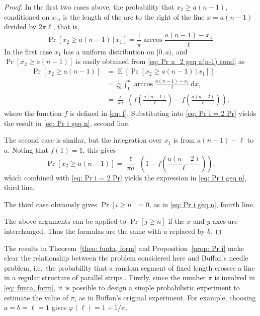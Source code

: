 \documentclass[12pt, a4paper]{article}
\newcommand{\cond}{\,|\,} %
\newcommand{\diff}{\,\mathrm d}
\DeclareMathOperator{\E}{E}
\newcommand{\funta}{\varphi} %
\newcommand{\len}{\ell} %
\begin{document}
\begin{proof}
In the first two cases above, the probability that $x_2 \geq a(n-1)$, conditioned on $x_1$, is the length of the arc to the right of the line $x=a(n-1)$ divided by $2\pi\len$, that is,
\begin{equation}
\label{eq: Pr x_2 geq a(n-1) cond}
\Pr[x_2 \geq a(n-1) \cond x_1] = \frac 1 \pi \arccos \frac{a(n-1)-x_1}{\len}.
\end{equation}
In the first case $x_1$ has a uniform distribution on $[0,a)$, and $\Pr[x_2 \geq a(n-1)]$ is easily obtained from \eqref{eq: Pr x_2 geq a(n-1) cond} as
\begin{equation}
\label{eq: Pr x_2 geq a(n-1), first case}
\begin{split}
\Pr[x_2 \geq a(n-1)] &= \E[\Pr[x_2 \geq a(n-1) \cond x_1]] \\
&= \frac 1 {\pi a} \int_0^a\arccos \frac{a(n-1)-x_1}{\len} \diff x_1 \\
&= \frac{\len}{\pi a}\,\, \left( f\left( \frac{a(n-1)}{\len} \right) - f\left( \frac{a(n-2)}{\len} \right) \right),
\end{split}
\end{equation}
where the function $f$ is defined in \eqref{eq: f}. Substituting into \eqref{eq: Pr i = 2 Pr} yields the result in \eqref{eq: Pr i geq n}, second line.

The second case is similar, but the integration over $x_1$ is from $a(n-1)-\len$ to $a$. Noting that $f(1)=1$, this gives
\begin{equation}
\label{eq: Pr x_2 geq a(n-1), second case}
\Pr[x_2 \geq a(n-1)] = \frac{\len}{\pi a}\,\, \left( 1 - f\left( \frac{a(n-2)}{\len} \right) \right),
\end{equation}
which combined with \eqref{eq: Pr i = 2 Pr} yields the expression in \eqref{eq: Pr i geq n}, third line.

The third case obviously gives $\Pr[i \geq n] = 0$, as in \eqref{eq: Pr i geq n}, fourth line.

The above arguments can be applied to $\Pr[j \geq n]$ if the $x$ and $y$ axes are interchanged. Thus the formulas are the same with $a$ replaced by $b$.
\end{proof}

The results in Theorem~\ref{theo: funta, form} and Proposition~\ref{prop: Pr i} make clear the relationship between the problem considered here and Buffon's needle problem, i.e.~the probability that a random segment of fixed length crosses a line in a regular structure of parallel strips \cite[section 1.1]{Mathai99}. Firstly, since the number $\pi$ is involved in \eqref{eq: funta, form}, it is possible to design a simple probabilistic experiment to estimate the value of $\pi$, as in Buffon's original experiment. For example, choosing $a=b=\len=1$ gives $\funta(\len) = 1+1/\pi$.
\end{document}
